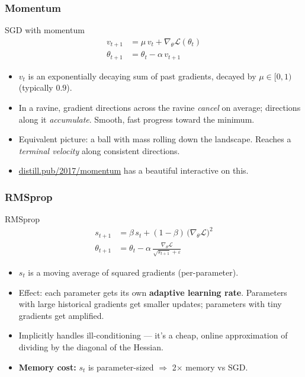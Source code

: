 \begin{frame}
\frametitle{Momentum}
\begin{block}{SGD with momentum}
\vspace{-0.3cm}
\begin{align*}
    v_{t+1} &= \mu\, v_t + \nabla_\theta \mathcal{L}(\theta_t) \\
    \theta_{t+1} &= \theta_t - \alpha\, v_{t+1}
\end{align*}
\end{block}
\begin{itemize}
    \pause
    \item $v_t$ is an exponentially decaying sum of past gradients,
    decayed by $\mu \in [0,1)$ (typically $0.9$).
    \pause
    \item In a ravine, gradient directions across the ravine \emph{cancel}
    on average; directions along it \emph{accumulate}. Smooth, fast progress
    toward the minimum.
    \pause
    \item Equivalent picture: a ball with mass rolling down the landscape.
    Reaches a \textit{terminal velocity} along consistent directions.
    \pause
    \item \href{https://distill.pub/2017/momentum/}{distill.pub/2017/momentum}
    has a beautiful interactive on this.
\end{itemize}
\end{frame}

\begin{frame}
\frametitle{RMSprop}
\begin{block}{RMSprop}
\vspace{-0.3cm}
\begin{align*}
    s_{t+1} &= \beta\, s_t + (1-\beta)\, \big(\nabla_\theta \mathcal{L}\big)^2 \\
    \theta_{t+1} &= \theta_t - \alpha\, \frac{\nabla_\theta \mathcal{L}}{\sqrt{s_{t+1}} + \varepsilon}
\end{align*}
\end{block}
\begin{itemize}
    \pause
    \item $s_t$ is a moving average of squared gradients (per-parameter).
    \pause
    \item Effect: each parameter gets its own \textbf{adaptive learning rate}.
    Parameters with large historical gradients get smaller updates;
    parameters with tiny gradients get amplified.
    \pause
    \item Implicitly handles ill-conditioning --- it's a cheap, online
    approximation of dividing by the diagonal of the Hessian.
    \pause
    \item \textbf{Memory cost:} $s_t$ is parameter-sized $\Rightarrow$ 2$\times$
    memory vs SGD.
\end{itemize}
\end{frame}

